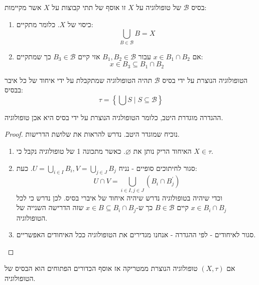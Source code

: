 \documentclass{tstextbook}
\begin{document}
\begin{definition}
בסיס \(\mathcal{B}\) של טופולוגיה על \(X\) זו אוסף של תתי קבוצות על \(X\) אשר מקיימות:

  \begin{enumerate}
    \item כיסוי של \(X\). כלומר מתקיים: 
$$\bigcup_{B\in{\mathcal{B}}}B=X$$


    \item אם \(x \in B_{1}\cap B_{2}\) עבור \(B_{1},B_{2}\in \mathcal{B}\) אזי קיים \(B_{3} \in \mathcal{B}\) כך שמתקיים: 
$$x\in B_{3}\subseteq B_{1}\cap B_{2}$$


  \end{enumerate}
\end{definition}
\begin{definition}
הטופולוגיה הנוצרת על ידי בסיס \(\mathcal{B}\) תהיה הטופולוגיה שמתקבלת על ידי איחוד של כל איבר בבסיס:
$$\tau=\left\{\bigcup S\mid S\subseteq\mathcal{B}\right\}$$

\end{definition}
\begin{lemma}
ההגדרה מוגדרת היטב, כלומר הטופולגיה הנוצרת על ידי בסיס היא אכן טופולוגיה.

\end{lemma}
\begin{proof}
נוכיח שמוגדר היטב. נדרש להראות את שלושת הדרישות.

  \begin{enumerate}
    \item האיחוד הריק נותן את \(\varnothing\). כאשר מתכונה 1 של טופולוגיה נקבל כי \(X \in \tau\). 


    \item סגור לחיתוכים סופיים - נניח \(U=\bigcup_{i \in I}B_{i},V=\bigcup_{j \in J}B_{j}\). כעת: 
$$U\cap V=\bigcup_{i\in I,j\in J}(B_{i}\cap B_{j}^{\prime})$$
וכדי שיהיה בטופולוגיה נדרש שיהיה איחוד של איברי בסיס. לכן נדרש כי לכל \(x \in B_{i}\cap B_{j}\) קיים \(B \in \mathcal{B}\) כך ש-\(x \in B\subseteq B_{i}\cap B_{j}\) שזה הדרישה השנייה של הטופולוגיה.


    \item סגור לאיחודים - לפי ההגדרה - אנחנו מגדירים את הטופולוגיה ככל האיחודים האפשריים. 


  \end{enumerate}
\end{proof}
\begin{proposition}
אם \(\left( X,\tau \right)\) טופולוגיה הנוצרת ממטריקה אז אוסף הכדורים הפתוחים הוא הבסיס של הטופולוגיה.

\end{proposition}
\end{document}
